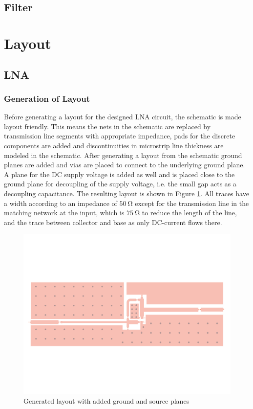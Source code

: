 \documentclass[a4paper]{article}        %
\begin{document}
		
	\subsection{Filter}

\section{Layout}
	\subsection{LNA}
		\subsubsection{Generation of Layout}
			Before generating a layout for the designed LNA circuit, the schematic is made layout friendly. This means the nets in the schematic are replaced by transmission line segments with appropriate impedance, pads for the discrete components are added and discontinuities in microstrip line thickness are modeled in the schematic. After generating a layout from the schematic ground planes are added and vias are placed to connect to the underlying ground plane. A plane for the DC supply voltage is added as well and is placed close to the ground plane for decoupling of the supply voltage, i.e. the small gap acts as a decoupling capacitance. The resulting layout is shown in Figure \ref{fig:lna_layout}. All traces have a width according to an impedance of $\SI{50}{\ohm}$ except for the transmission line in the matching network at the input, which is $\SI{75}{\ohm}$ to reduce the length of the line, and the trace between collector and base as only DC-current flows there. 

			\begin{figure}[H]
			\centering
				\includegraphics[width=\textwidth]{fig/LNA/LNA_layout.pdf}
				\caption{Generated layout with added ground and source planes}
				\label{fig:lna_layout}
			\end{figure}
\end{document}
